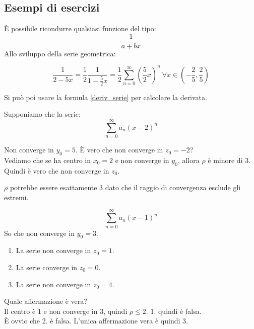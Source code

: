 


\subsection{Esempi di esercizi}\label{sub:esempi_di_esercizi} 

\begin{esempio}
  È possibile ricondurre qualsiasi funzione del tipo:
  \begin{equation}
    \frac{1}{a+bx}
  \end{equation}
  Allo sviluppo della serie geometrica:

  \begin{equation}
    \frac{1}{2-5x}=\frac{1}{2}\frac{1}{1- \frac{5}{2}x}=\frac{1}{2}\sum_{n=0}^{\infty}(\frac{5}{2}x)^n\ \forall x\in (- \frac{2}{5}, \frac{2}{5})
  \end{equation}
  
  Si può poi usare la formula \ref{deriv_serie} per calcolare la derivata.
\end{esempio}

\begin{esempio}[]

  Supponiamo che la serie: 
  \begin{equation}
    \sum_{n=0}^{\infty}a_n(x-2)^n
  \end{equation}

  Non converge in $y_0=5$. È vero che non converge in $z_0=-2$? \\
  Vediamo che se ha centro in $x_0=2$ e non converge in $y_0$, allora $\rho$ è minore di 3. Quindi è vero che non converge in $z_0$.

  \begin{osservazione}[]
    $\rho$ potrebbe essere esattamente 3 dato che il raggio di convergenza esclude gli estremi.
  \end{osservazione}

\end{esempio}

\begin{esempio}[]

  \begin{equation}
    \sum_{n=0}^{\infty}a_n(x-1)^n
  \end{equation}
  So che non converge in $y_0=3$.

  \begin{enumerate}
    \item La serie non converge in $z_0=1$.
    \item La serie converge in $z_0=0$.
    \item La serie non converge in $z_0=4$.
  \end{enumerate}

  Quale affermazione è vera?\\
  Il centro è 1 e non converge in 3, quindi $\rho \leq 2$. 1. quindi è falsa. \\
  È ovvio che 2. è falsa. L'unica affermazione vera è quindi 3.

\end{esempio}

